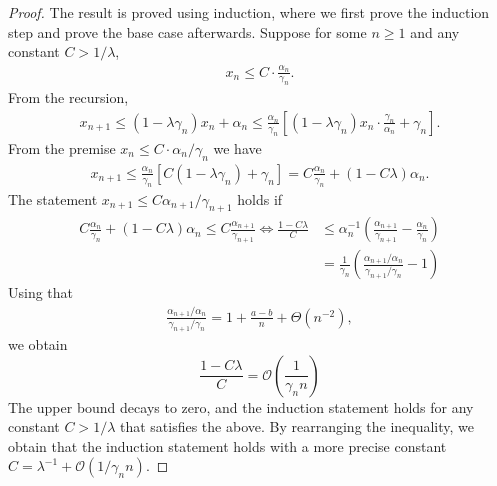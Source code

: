 \documentclass[10pt,a4paper]{amsart}
\begin{document}
\begin{proof}
    The result is proved using induction, where we first prove the induction step and prove the base case afterwards. 
    Suppose for some $n \geq 1$ and any constant $C > 1/\lambda$,
    \begin{align*}
        x_{n} \leq C \cdot \frac{\alpha_n}{\gamma_n} . 
    \end{align*}
    From the recursion,
    \begin{align*}
        x_{n+1} \leq (1 - \lambda \gamma_n) x_n + \alpha_n 
        \leq \frac{\alpha_n}{\gamma_n} \left[(1 - \lambda \gamma_n) x_n \cdot \frac{\gamma_n}{\alpha_n} + \gamma_n  \right] .
    \end{align*}
    From the premise $x_n \leq C \cdot  \alpha_n/\gamma_n$ we have
    \begin{align*}
        x_{n+1} \leq  \frac{\alpha_n}{\gamma_n} \left[C(1 - \lambda \gamma_n)  + \gamma_n  \right] 
        = C \frac{\alpha_n}{\gamma_n} + \left(1 - C \lambda \right)\alpha_n 
        .
    \end{align*}
    The statement $x_{n+1} \leq C \alpha_{n+1}/\gamma_{n+1}$ holds if
    \begin{align*}
        C \frac{\alpha_n}{\gamma_n} + \left(1 - C \lambda \right)\alpha_n 
        \leq 
        C\frac{\alpha_{n+1}}{\gamma_{n+1}}
        \Leftrightarrow 
        \frac{1-C\lambda}{C} 
        &\leq 
        \alpha_n^{-1} \left(\frac{\alpha_{n+1}}{\gamma_{n+1}} - \frac{\alpha_n}{\gamma_n} \right)
        \\ &
        =  \frac{1}{\gamma_n} \left(
        \frac{\alpha_{n+1}/\alpha_n}{\gamma_{n+1}/\gamma_n} - 1\right)
    \end{align*}
    Using that
    \begin{align*}
        \frac{\alpha_{n+1}/\alpha_n}{\gamma_{n+1}/\gamma_n} 
        = 1 + \frac{a-b}{n} + \Theta\left(n^{-2} \right), 
    \end{align*}
    we obtain 
    \begin{equation}
        \frac{1 - C \lambda}{C} 
        =
        \mathcal{O}\left(\frac{1}{\gamma_n n} \right)
    \end{equation}
    The upper bound decays to zero, and the induction statement holds for any constant $C > 1/\lambda$ that satisfies the above. 
    By rearranging the inequality, we obtain that the induction statement holds with a more precise constant $C = \lambda^{-1} + \mathcal{O}(1/\gamma_n n)$. 
    


\end{proof}
\end{document}
